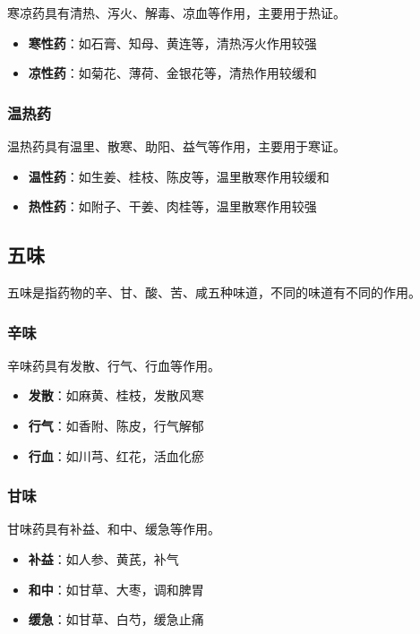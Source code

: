 \documentclass[12pt,UTF8]{ctexbook}
\begin{document}
寒凉药具有清热、泻火、解毒、凉血等作用，主要用于热证。

\begin{itemize}
\item \textbf{寒性药}：如石膏、知母、黄连等，清热泻火作用较强
\item \textbf{凉性药}：如菊花、薄荷、金银花等，清热作用较缓和
\end{itemize}

\subsubsection{温热药}

温热药具有温里、散寒、助阳、益气等作用，主要用于寒证。

\begin{itemize}
\item \textbf{温性药}：如生姜、桂枝、陈皮等，温里散寒作用较缓和
\item \textbf{热性药}：如附子、干姜、肉桂等，温里散寒作用较强
\end{itemize}

\subsection{五味}

五味是指药物的辛、甘、酸、苦、咸五种味道，不同的味道有不同的作用。

\subsubsection{辛味}

辛味药具有发散、行气、行血等作用。

\begin{itemize}
\item \textbf{发散}：如麻黄、桂枝，发散风寒
\item \textbf{行气}：如香附、陈皮，行气解郁
\item \textbf{行血}：如川芎、红花，活血化瘀
\end{itemize}

\subsubsection{甘味}

甘味药具有补益、和中、缓急等作用。

\begin{itemize}
\item \textbf{补益}：如人参、黄芪，补气
\item \textbf{和中}：如甘草、大枣，调和脾胃
\item \textbf{缓急}：如甘草、白芍，缓急止痛
\end{itemize}
\end{document}
